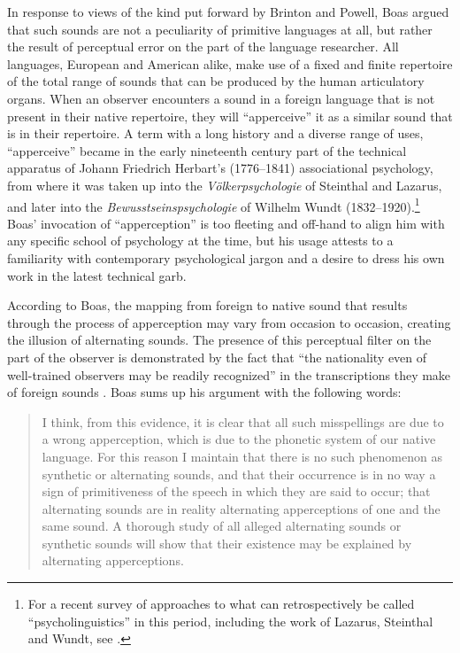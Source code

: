 \documentclass[output=paper]{langscibook}
\begin{document}
In response to views of the kind put forward by Brinton and Powell, Boas argued that such sounds are not a peculiarity of primitive languages at all, but rather the result of perceptual error on the part of the language researcher. All languages, European and American alike, make use of a fixed and finite repertoire of the total range of sounds that can be produced by the human articulatory organs. When an observer encounters a sound in a foreign language that is not present in their native repertoire, they will ``apperceive'' it as a similar sound that is in their repertoire. A term with a long history and a diverse range of uses, ``apperceive'' became in the early nineteenth century part of the technical apparatus of Johann Friedrich Herbart's (1776--1841) associational psychology, from where it was taken up into the \emph{Völkerpsychologie} of Steinthal and Lazarus, and later into the \emph{Bewusstseinspsychologie} of Wilhelm Wundt (1832--1920).\footnote{For a recent survey of approaches to what can retrospectively be called ``psycholinguistics'' in this period, including the work of Lazarus, Steinthal and Wundt, see \citet{Levelt2013}.} Boas' invocation of ``apperception'' is too fleeting and off-hand to align him with any specific school of psychology at the time, but his usage attests to a familiarity with contemporary psychological jargon and a desire to dress his own work in the latest technical garb.

According to Boas, the mapping from foreign to native sound that results through the process of apperception may vary from occasion to occasion, creating the illusion of alternating sounds. The presence of this perceptual filter on the part of the observer is demonstrated by the fact that ``the nationality even of well-trained observers may be readily recognized'' in the transcriptions they make of foreign sounds \citep[51]{Boas1889}. Boas sums up his argument with the following words:

\begin{quotation}
I think, from this evidence, it is clear that all such misspellings are due to a wrong apperception, which is due to the phonetic system of our native language. For this reason I maintain that there is no such phenomenon as synthetic or alternating sounds, and that their occurrence is in no way a sign of primitiveness of the speech in which they are said to occur; that alternating sounds are in reality alternating apperceptions of one and the same sound. A thorough study of all alleged alternating sounds or synthetic sounds will show that their existence may be explained by alternating apperceptions. \citep[52]{Boas1889}
\end{quotation}
\end{document}
